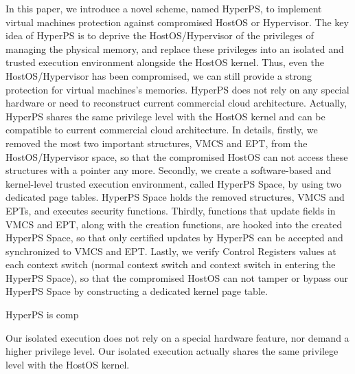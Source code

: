 In this paper, we introduce a novel scheme, named HyperPS, to implement virtual machines protection against compromised HostOS or Hypervisor.
The key idea of HyperPS is to deprive the HostOS/Hypervisor of the privileges of managing the physical memory, and replace these privileges into an isolated and trusted execution environment alongside the HostOS kernel.
Thus, even the HostOS/Hypervisor has been compromised, we can still provide a strong protection for virtual machines's memories. 
HyperPS does not rely on any special hardware or need to reconstruct current commercial cloud architecture. Actually, HyperPS shares the same privilege level with the HostOS kernel and can be compatible to current commercial cloud architecture. 
In details, firstly, we removed the most two important structures, VMCS and EPT, from the HostOS/Hypervisor space, so that the compromised HostOS can not access these structures with a pointer any more. Secondly,  
we create a software-based and kernel-level trusted execution environment, called HyperPS Space, by using two dedicated page tables. HyperPS Space holds the removed structures, VMCS and EPTs, and executes security functions. 
Thirdly, functions that update fields in VMCS and EPT, along with the creation functions, are hooked into the created HyperPS Space, so that only certified updates by HyperPS can be accepted and synchronized to VMCS and EPT.
Lastly, we verify Control Registers values at each context switch (normal context switch and context switch in entering the HyperPS Space), so that the compromised HostOS can not tamper or bypass our HyperPS Space by constructing a dedicated kernel page table.  

\iffalse
HyperPS is comp

Our isolated execution does not rely on a special hardware feature, nor demand a higher privilege level. Our isolated execution actually shares the same privilege level with the HostOS kernel. 


